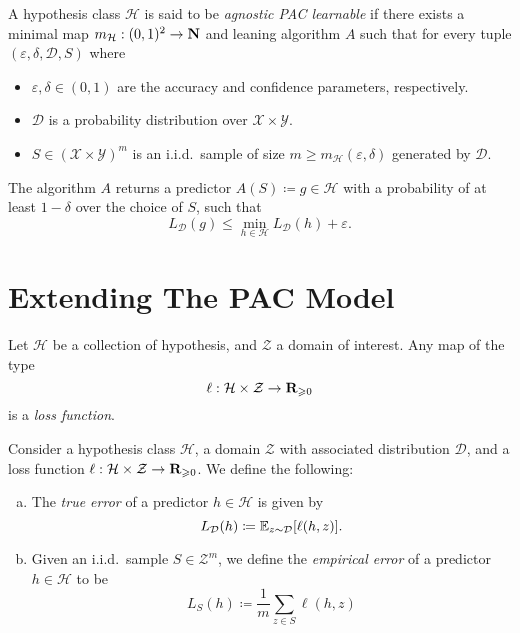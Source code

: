 \begin{definition}
    \label{def:agnostic-pac-learning-model}
    A hypothesis class \(\mathcal{H}\) is said to be \emph{agnostic PAC learnable}
    if there exists a minimal map \(m_{\mathcal{H}}: (0, 1)^2 \to \mathbf{N}\) and leaning
    algorithm \(A\) such that for every tuple \((\varepsilon, \delta,
    \mathcal{D}, S)\) where
    \begin{itemize}\setlength\itemsep{0em}
        \item \(\varepsilon, \delta \in (0, 1)\) are the accuracy and confidence
              parameters, respectively.
        \item \(\mathcal{D}\) is a probability distribution over
              \(\mathcal{X} \times \mathcal{Y}\).
        \item \(S \in (\mathcal{X} \times \mathcal{Y})^m\) is an i.i.d.~sample of size
              \(m \geq m_{\mathcal{H}}(\varepsilon, \delta)\) generated by \(\mathcal{D}\).
    \end{itemize}
    The algorithm \(A\) returns a predictor \(A(S) \coloneq g \in \mathcal{H}\) with
    a probability of at least \(1 - \delta\) over the choice of \(S\), such that
    \[
        L_{\mathcal{D}}(g) \leq \min_{h \in \mathcal{H}} L_{\mathcal{D}}(h) + \varepsilon.
    \]
\end{definition}

\section{Extending The PAC Model}

\begin{definition}
    \label{def:generalised-loss-function}
    Let \(\mathcal{H}\) be a collection of hypothesis, and \(\mathcal{Z}\) a domain
    of interest. Any map of the type
    \[
        \ell: \mathcal{H} \times \mathcal{Z} \to \mathbf{R}_{\geqslant 0}
    \]
    is a \emph{loss function}.
\end{definition}

\begin{definition}
    \label{def:generalised-error-functions}
    Consider a hypothesis class \(\mathcal{H}\), a domain \(\mathcal{Z}\) with
    associated distribution \(\mathcal{D}\), and a loss function \(\ell: \mathcal{H}
    \times \mathcal{Z} \to \mathbf{R}_{\geqslant 0}\). We define the following:
    \begin{enumerate}[(a)]\setlength\itemsep{0em}
        \item The \emph{true error} of a predictor \(h \in \mathcal{H}\) is given by
              \[
                  L_{\mathcal{D}}(h) \coloneq \operatorname{\mathbb{E}}_{z \sim \mathcal{D}}[\ell(h, z)].
              \]
        \item Given an i.i.d.~sample \(S \in \mathcal{Z}^m\), we define the \emph{empirical
                  error} of a predictor \(h \in \mathcal{H}\) to be
              \[
                  L_S(h) \coloneq \frac{1}{m} \sum_{z \in S} \ell(h, z)
              \]
    \end{enumerate}
\end{definition}

